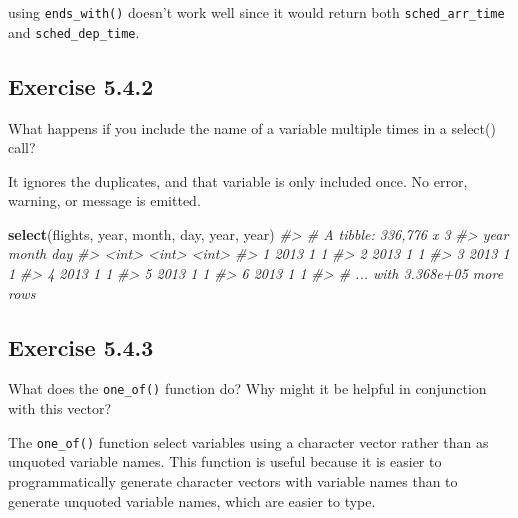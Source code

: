 \documentclass[]{book}
\newenvironment{Shaded}{\begin{snugshade}}{\end{snugshade}}
\newcommand{\CommentTok}[1]{\textcolor[rgb]{0.56,0.35,0.01}{\textit{#1}}}
\newcommand{\KeywordTok}[1]{\textcolor[rgb]{0.13,0.29,0.53}{\textbf{#1}}}
\newcommand{\NormalTok}[1]{#1}
\theoremstyle{plain}
\theoremstyle{remark}
\theoremstyle{definition}
\theoremstyle{definition}
\theoremstyle{definition}
\theoremstyle{remark}
\begin{document}
using \texttt{ends\_with()} doesn't work well since it would return both
\texttt{sched\_arr\_time} and \texttt{sched\_dep\_time}.

\hypertarget{exercise-5.4.2}{%
\subsection*{\texorpdfstring{Exercise
{5.4.2}}{Exercise 5.4.2}}\label{exercise-5.4.2}}

What happens if you include the name of a variable multiple times in a
select() call?

It ignores the duplicates, and that variable is only included once. No
error, warning, or message is emitted.

\begin{Shaded}
\begin{Highlighting}[]
\KeywordTok{select}\NormalTok{(flights, year, month, day, year, year)}
\CommentTok{#> # A tibble: 336,776 x 3}
\CommentTok{#>    year month   day}
\CommentTok{#>   <int> <int> <int>}
\CommentTok{#> 1  2013     1     1}
\CommentTok{#> 2  2013     1     1}
\CommentTok{#> 3  2013     1     1}
\CommentTok{#> 4  2013     1     1}
\CommentTok{#> 5  2013     1     1}
\CommentTok{#> 6  2013     1     1}
\CommentTok{#> # ... with 3.368e+05 more rows}
\end{Highlighting}
\end{Shaded}

\hypertarget{exercise-5.4.3}{%
\subsection*{\texorpdfstring{Exercise
{5.4.3}}{Exercise 5.4.3}}\label{exercise-5.4.3}}

What does the \texttt{one\_of()} function do? Why might it be helpful in
conjunction with this vector?

The \texttt{one\_of()} function select variables using a character
vector rather than as unquoted variable names. This function is useful
because it is easier to programmatically generate character vectors with
variable names than to generate unquoted variable names, which are
easier to type.
\end{document}
